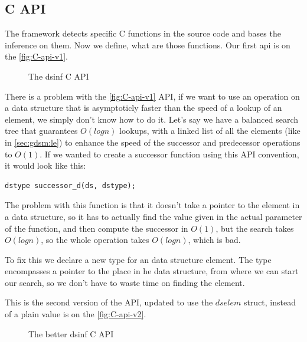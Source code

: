 \documentclass[a4paper,11pt]{article}
\begin{document}
	\subsection{C API}
        The framework detects specific C functions in the source code and bases the inference on them. Now we define,
        what are those functions. Our first api is on the \autoref{fig:C-api-v1}.

        \begin{figure}[h!]
            

            \caption{The dsinf C API}

            \label{fig:C-api-v1}
        \end{figure}

        There is a problem with the \autoref{fig:C-api-v1} API, if we want to use an operation on a data structure that
        is asymptoticly faster than the speed of a lookup of an element, we simply don't know how to do it. Let's say we
        have a balanced search tree that guarantees $O(log n)$ lookups, with a linked list of all the elements (like in
        \autoref{sec:gdsm:le}) to enhance the speed of the successor and predecessor operations to $O(1)$. If we wanted to create a
        successor function using this API convention, it would look like this:

        \begin{lstlisting}
dstype successor_d(ds, dstype);
        \end{lstlisting}
        The problem with this function is that it doesn't take a pointer to the element in a data structure, so it has
        to actually find the value given in the actual parameter of the function, and then compute the successor in
        $O(1)$, but the search takes $O(log n)$, so the whole operation takes $O(log n)$, which is bad.

        To fix this we declare a new type for an data structure element. The type encompasses a pointer to the place in
        he data structure, from where we can start our search, so we don't have to waste time on finding the element.

        This is the second version of the API, updated to use the $dselem$ struct, instead of a plain value is on the
        \autoref{fig:C-api-v2}.

        \begin{figure}[h!]
            
            \caption{The better dsinf C API}

            \label{fig:C-api-v2}
        \end{figure}
\end{document}
